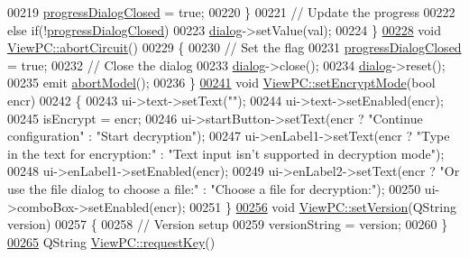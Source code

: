 \begin{DoxyCode}
00219         \hyperlink{class_view_p_c_add8c82aa2b0b934212aa5bde9277ab36}{progressDialogClosed} = \textcolor{keyword}{true};
00220     \}
00221     \textcolor{comment}{// Update the progress}
00222     \textcolor{keywordflow}{else} \textcolor{keywordflow}{if}(!\hyperlink{class_view_p_c_add8c82aa2b0b934212aa5bde9277ab36}{progressDialogClosed})
00223         \hyperlink{class_view_p_c_a31abbb470fe329b44e6ffee202b903ca}{dialog}->setValue(val);
00224 \}
\hypertarget{viewpc_8cpp_source.tex_l00228}{}\hyperlink{class_view_p_c_ad7ba2fcf1d17862de15e32432823f7b0}{00228} \textcolor{keywordtype}{void} \hyperlink{class_view_p_c_ad7ba2fcf1d17862de15e32432823f7b0}{ViewPC::abortCircuit}()
00229 \{
00230     \textcolor{comment}{// Set the flag}
00231     \hyperlink{class_view_p_c_add8c82aa2b0b934212aa5bde9277ab36}{progressDialogClosed} = \textcolor{keyword}{true};
00232     \textcolor{comment}{// Close the dialog}
00233     \hyperlink{class_view_p_c_a31abbb470fe329b44e6ffee202b903ca}{dialog}->close();
00234     \hyperlink{class_view_p_c_a31abbb470fe329b44e6ffee202b903ca}{dialog}->reset();
00235     emit \hyperlink{class_view_p_c_aa652102ce6b5757b8eef830409c8cabf}{abortModel}();
00236 \}
\hypertarget{viewpc_8cpp_source.tex_l00241}{}\hyperlink{class_view_p_c_a5b48951efefdc0e3039c9a4bf185320b}{00241} \textcolor{keywordtype}{void} \hyperlink{class_view_p_c_a5b48951efefdc0e3039c9a4bf185320b}{ViewPC::setEncryptMode}(\textcolor{keywordtype}{bool} encr)
00242 \{
00243     ui->text->setText(\textcolor{stringliteral}{""});
00244     ui->text->setEnabled(encr);
00245     isEncrypt = encr;
00246     ui->startButton->setText(encr ? \textcolor{stringliteral}{"Continue configuration"} : \textcolor{stringliteral}{"Start decryption"});
00247     ui->enLabel1->setText(encr ? \textcolor{stringliteral}{"Type in the text for encryption:"} : \textcolor{stringliteral}{"Text input isn't supported in
       decryption mode"});
00248     ui->enLabel1->setEnabled(encr);
00249     ui->enLabel2->setText(encr ? \textcolor{stringliteral}{"Or use the file dialog to choose a file:"} : \textcolor{stringliteral}{"Choose a file for
       decryption:"});
00250     ui->comboBox->setEnabled(encr);
00251 \}
\hypertarget{viewpc_8cpp_source.tex_l00256}{}\hyperlink{class_view_p_c_ac05220df875b7c4f24405a5742476ebf}{00256} \textcolor{keywordtype}{void} \hyperlink{class_view_p_c_ac05220df875b7c4f24405a5742476ebf}{ViewPC::setVersion}(QString version)
00257 \{
00258     \textcolor{comment}{// Version setup}
00259     versionString = version;
00260 \}
\hypertarget{viewpc_8cpp_source.tex_l00265}{}\hyperlink{class_view_p_c_a559c95675ec98b15451f3bca47033d9c}{00265} QString \hyperlink{class_view_p_c_a559c95675ec98b15451f3bca47033d9c}{ViewPC::requestKey}()

\end{DoxyCode}
